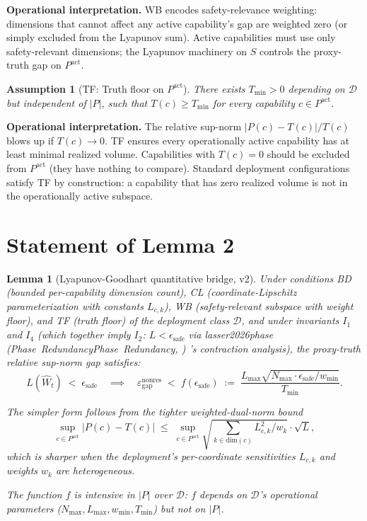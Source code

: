 \documentclass{article}
\makeatletter
\newcommand{\citep}[2][]{%
  \begingroup
  \def\@tmpkey{#2}%
  \ifx\@tmpkey\@empty\else
    (\ifx\@empty#1\@empty\else #1, \fi
     \@nameuse{bibkey@\@tmpkey})%
  \fi
  \endgroup
}
\newtheorem{lemma}{Lemma}
\newtheorem{assumption}{Assumption}
\newcommand{\Lyap}{L}
\newcommand{\Wm}{\hat{W}}
\newcommand{\epsnonres}{\varepsilon_{\mathrm{gap}}^{\mathrm{nonres}}}
\makeatother
\begin{document}
\textbf{Operational interpretation.} WB encodes safety-relevance
weighting: dimensions that cannot affect any active capability's
gap are weighted zero (or simply excluded from the Lyapunov sum).
Active capabilities must use only safety-relevant dimensions; the
Lyapunov machinery on $S$ controls the proxy-truth gap on
$P^{\mathrm{act}}$.

\begin{assumption}[TF: Truth floor on $P^{\mathrm{act}}$]
\label{ass:TF}
There exists $T_{\min} > 0$ depending on $\mathcal{D}$ but
independent of $|P|$, such that $T(c) \geq T_{\min}$ for every
capability $c \in P^{\mathrm{act}}$.
\end{assumption}

\textbf{Operational interpretation.} The relative sup-norm
$|P(c)-T(c)|/T(c)$ blows up if $T(c) \to 0$. TF ensures every
operationally active capability has at least minimal realized
volume.  Capabilities with $T(c) = 0$ should be excluded from
$P^{\mathrm{act}}$ (they have nothing to compare).  Standard
deployment configurations satisfy TF by construction: a capability
that has zero realized volume is not in the operationally active
subspace.

\section{Statement of Lemma 2}

\begin{lemma}[Lyapunov-Goodhart quantitative bridge, v2]
\label{lem:2}
Under conditions BD (bounded per-capability dimension count), CL
(coordinate-Lipschitz parameterization with constants $L_{c,k}$),
WB (safety-relevant subspace with weight floor), and TF (truth
floor) of the deployment class $\mathcal{D}$, and under invariants
$I_1$ and $I_4$ (which together imply $I_2$:
$\Lyap < \epsilon_{\mathrm{safe}}$ via
\citep[Phase~Redundancy]{lasser2026phase}'s contraction analysis),
the proxy-truth relative sup-norm gap satisfies:
\[
  \Lyap(\Wm_t) \;<\; \epsilon_{\mathrm{safe}}
  \quad \implies \quad
  \epsnonres \;<\; f(\epsilon_{\mathrm{safe}})
  \;:=\; \frac{L_{\max} \sqrt{N_{\max} \cdot \epsilon_{\mathrm{safe}}
  / w_{\min}}}{T_{\min}}.
\]

The simpler form follows from the tighter weighted-dual-norm bound
\[
  \sup_{c \in P^{\mathrm{act}}} |P(c) - T(c)|
  \;\leq\;
  \sup_{c \in P^{\mathrm{act}}}
  \sqrt{\sum_{k \in \mathrm{dim}(c)} L_{c,k}^2 / w_k}
  \cdot \sqrt{\Lyap},
\]
which is sharper when the deployment's per-coordinate sensitivities
$L_{c,k}$ and weights $w_k$ are heterogeneous.

The function $f$ is intensive in $|P|$ over $\mathcal{D}$: $f$
depends on $\mathcal{D}$'s operational parameters
($N_{\max}, L_{\max}, w_{\min}, T_{\min}$) but not on $|P|$.
\end{lemma}
\end{document}
